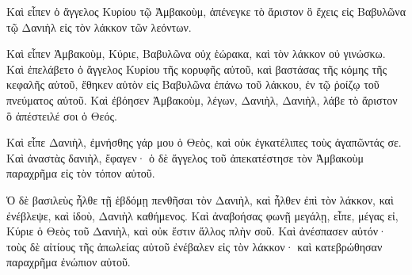 {Καὶ εἶπεν ὁ ἄγγελος Κυρίου τῷ Ἀμβακοὺμ, ἀπένεγκε τὸ ἄριστον ὃ ἔχεις εἰς Βαβυλῶνα τῷ Δανιὴλ εἰς τὸν λάκκον τῶν λεόντων.
\par }{\PP {}Καὶ εἶπεν Ἀμβακοὺμ, Κύριε, Βαβυλῶνα οὐχ ἑώρακα, καὶ τὸν λάκκον οὐ γινώσκω.
Καὶ ἐπελάβετο ὁ ἄγγελος Κυρίου τῆς κορυφῆς αὐτοῦ, καὶ βαστάσας τῆς κόμης τῆς κεφαλῆς αὐτοῦ, ἔθηκεν αὐτὸν εἰς Βαβυλῶνα ἐπάνω τοῦ λάκκου, ἐν τῷ ῥοίζῳ τοῦ πνεύματος αὐτοῦ.
Καὶ ἐβόησεν Ἀμβακοὺμ, λέγων, Δανιὴλ, Δανιὴλ, λάβε τὸ ἄριστον ὃ ἀπέστειλέ σοι ὁ Θεός.
\par }{\PP {}Καὶ εἶπε Δανιὴλ, ἐμνήσθης γάρ μου ὁ Θεὸς, καὶ οὐκ ἐγκατέλιπες τοὺς ἀγαπῶντάς σε.
Καὶ ἀναστὰς δανιὴλ, ἔφαγεν· ὁ δὲ ἄγγελος τοῦ ἀπεκατέστησε τὸν Ἀμβακοὺμ παραχρῆμα εἰς τὸν τόπον αὐτοῦ.
\par }{\PP {}Ὁ δὲ βασιλεὺς ἦλθε τῇ ἑβδόμῃ πενθῆσαι τὸν Δανιὴλ, καὶ ἦλθεν ἐπὶ τὸν λάκκον, καὶ ἐνέβλεψε, καὶ ἰδοὺ, Δανιὴλ καθήμενος.
Καὶ ἀναβοήσας φωνῇ μεγάλῃ, εἶπε, μέγας εἰ, Κύριε ὁ Θεὸς τοῦ Δανιὴλ, καὶ οὐκ ἔστιν ἄλλος πλὴν σοῦ.
Καὶ ἀνέσπασεν αὐτόν· τοὺς δὲ αἰτίους τῆς ἀπωλείας αὐτοῦ ἐνέβαλεν εἰς τὸν λάκκον· καὶ κατεβρώθησαν παραχρῆμα ἐνώπιον αὐτοῦ.
\par }